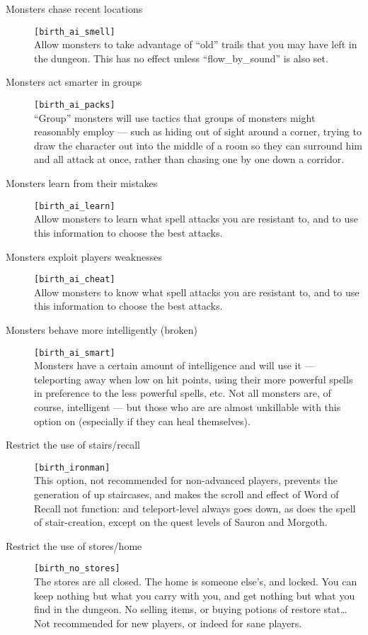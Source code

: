\begin{description}
\item[Monsters chase recent locations] \verb+[birth_ai_smell]+\\
     Allow monsters to take advantage of ``old'' trails that you may have left
     in the dungeon. This has no effect unless ``flow\_by\_sound'' is also set.

\item[Monsters act smarter in groups] \verb+[birth_ai_packs]+\\
     ``Group'' monsters will use tactics that groups of monsters might
     reasonably employ --- such as hiding out of sight around a corner,
     trying to draw the character out into the middle of a room so they
     can surround him and all attack at once, rather than chasing one
     by one down a corridor.

\item[Monsters learn from their mistakes] \verb+[birth_ai_learn]+\\
     Allow monsters to learn what spell attacks you are resistant to,
     and to use this information to choose the best attacks.

\item[Monsters exploit players weaknesses] \verb+[birth_ai_cheat]+\\
     Allow monsters to know what spell attacks you are resistant to,
     and to use this information to choose the best attacks.

 \item[Monsters behave more intelligently (broken)]
 \verb+[birth_ai_smart]+\\
     Monsters have a certain amount of intelligence and will use it ---
     teleporting away when low on hit points, using their more powerful
     spells in preference to the less powerful spells, etc. Not all
     monsters are, of course, intelligent --- but those who are are almost
     unkillable with this option on (especially if they can heal
     themselves).

\item[Restrict the use of stairs/recall] \verb+[birth_ironman]+\\
     This option, not recommended for non-advanced players, prevents the
     generation of up staircases, and makes the scroll and effect of Word
     of Recall not function: and teleport-level always goes down, as does
     the spell of stair-creation, except on the quest levels of Sauron and
     Morgoth.

\item[Restrict the use of stores/home] \verb+[birth_no_stores]+\\
     The stores are all closed. The home is someone else's, and locked. You
     can keep nothing but what you carry with you, and get nothing but what
     you find in the dungeon. No selling items, or buying potions of
     restore stat\ldots Not recommended for new players, or indeed for
     sane players.


\end{description}
